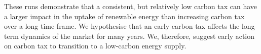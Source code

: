 These runs demonstrate that a consistent, but relatively low carbon tax can have a larger impact in the uptake of renewable energy than increasing carbon tax over a long time frame. We hypothesise that an early carbon tax affects the long-term dynamics of the market for many years. We, therefore, suggest early action on carbon tax to transition to a low-carbon energy supply.


%








